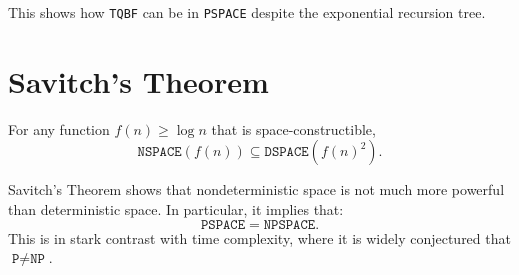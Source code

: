 This shows how \texttt{TQBF} can be in \texttt{PSPACE} despite the exponential recursion tree.


\section{Savitch's Theorem}

\begin{theorem}
For any function $f(n) \geq \log n$ that is space-constructible,
\[
\texttt{NSPACE}(f(n)) \subseteq \texttt{DSPACE}(f(n)^2).
\]
\end{theorem}

\begin{remark}
Savitch's Theorem shows that nondeterministic space is not much more powerful than deterministic space. In particular, it implies that:
\[
\texttt{PSPACE} = \texttt{NPSPACE}.
\]
This is in stark contrast with time complexity, where it is widely conjectured that $\texttt{P} \ne \texttt{NP}$.
\end{remark}

